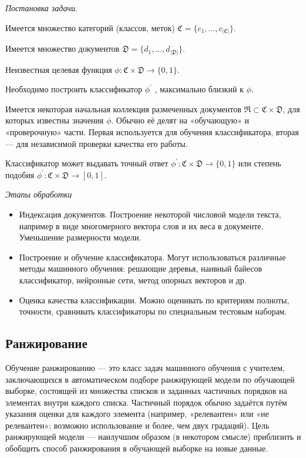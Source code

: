 \emph{Постановка задачи}.

Имеется множество категорий (классов, меток) $\mathfrak{C} = \{ c_1, ... , c_{ \left| \mathfrak{C} \right| } \}$.

Имеется множество документов $\mathfrak{D} = \{ d_1, ... , d_{ \left| \mathfrak{D} \right| } \}$.

Неизвестная целевая функция $\phi\colon \mathfrak{C} \times \mathfrak{D} \rightarrow \{ 0, 1 \}$.

Необходимо построить классификатор $\phi^\prime$ , максимально близкий к $\phi$.

Имеется некоторая начальная коллекция размеченных документов $\mathfrak{R} \subset \mathfrak{C} \times \mathfrak{D}$, для которых известны значения $\phi$. Обычно её делят на «обучающую» и «проверочную» части. Первая используется для обучения классификатора, вторая — для независимой проверки качества его работы.

Классификатор может выдавать точный ответ $\phi^\prime\colon \mathfrak{C} \times \mathfrak{D} \rightarrow \{ 0, 1 \}$ или степень подобия $\phi^\prime\colon \mathfrak{C} \times \mathfrak{D} \rightarrow [ 0, 1 ]$.

\emph{Этапы обработки}

\begin{itemize}

  \item Индексация документов. Построение некоторой числовой модели текста, например в виде многомерного вектора слов и их веса в документе. Уменьшение размерности модели.

  \item Построение и обучение классификатора. Могут использоваться различные методы машинного обучения: решающие деревья, наивный байесов классификатор, нейронные сети, метод опорных векторов и др.

  \item Оценка качества классификации. Можно оценивать по критериям полноты, точности, сравнивать классификаторы по специальным тестовым наборам. 
\end{itemize}

\subsection{Ранжирование}

Обучение ранжированию — это класс задач машинного обучения с учителем, заключающихся в автоматическом подборе ранжирующей модели по обучающей выборке, состоящей из множества списков и заданных частичных порядков на элементах внутри каждого списка. Частичный порядок обычно задаётся путём указания оценки для каждого элемента (например, «релевантен» или «не релевантен»; возможно использование и более, чем двух градаций). Цель ранжирующей модели — наилучшим образом (в некотором смысле) приблизить и обобщить способ ранжирования в обучающей выборке на новые данные.

